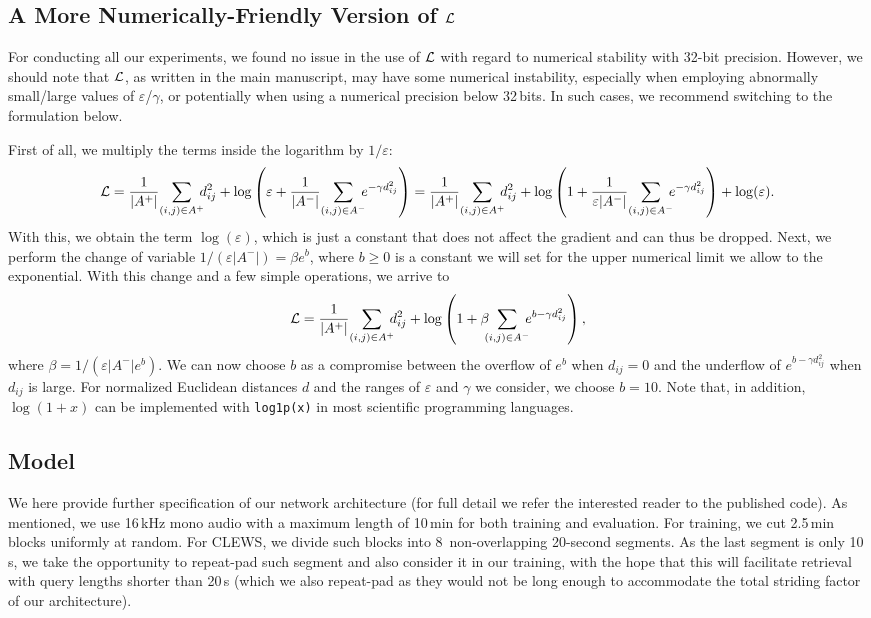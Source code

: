 \subsection{A More Numerically-Friendly Version of $\mathcal{L}$}

For conducting all our experiments, we found no issue in the use of $\mathcal{L}$ with regard to numerical stability with 32-bit precision. However, we should note that $\mathcal{L}$, as written in the main manuscript, may have some numerical instability, especially when employing abnormally small/large values of $\varepsilon$/$\gamma$, or potentially when using a numerical precision below 32\,bits. In such cases, we recommend switching to the formulation below.

First of all, we multiply the terms inside the logarithm by $1/\varepsilon$:
\begin{equation*}
\fu{L} = \frac{1}{|A^+|}\!\sum_{(i,j)\in A^+}\!\!\!d_{ij}^2 + \log\left(\varepsilon + \frac{1}{|A^-|}\!\sum_{(i,j)\in A^-}\!\!\!e^{-\gamma d^2_{ij}}\right) = \frac{1}{|A^+|}\!\sum_{(i,j)\in A^+}\!\!\!d_{ij}^2 + \log\left(1 + \frac{1}{\varepsilon|A^-|}\!\sum_{(i,j)\in A^-}\!\!\!e^{-\gamma d^2_{ij}}\right) + \log(\varepsilon) .
\end{equation*}
With this, we obtain the term $\log(\varepsilon)$, which is just a constant that does not affect the gradient and can thus be dropped. Next, we perform the change of variable $1/(\varepsilon|A^-|)=\beta e^b$, where $b\geq0$ is a constant we will set for the upper numerical limit we allow to the exponential. With this change and a few simple operations, we arrive to
\begin{equation*}
\fu{L} = \frac{1}{|A^+|}\!\sum_{(i,j)\in A^+}\!\!\!d_{ij}^2 + \log\left(1 + \beta\!\!\!\sum_{(i,j)\in A^-}\!\!\!e^{b-\gamma d^2_{ij}}\right) ,
\end{equation*}
where $\beta=1/(\varepsilon|A^-|e^b)$. We can now choose $b$ as a compromise between the overflow of $e^b$ when $d_{ij}=0$ and the underflow of $e^{b-\gamma d_{ij}^2}$ when $d_{ij}$ is large. For normalized Euclidean distances $d$ and the ranges of $\varepsilon$ and $\gamma$ we consider, we choose $b=10$. Note that, in addition, $\log(1+x)$ can be implemented with \verb|log1p(x)| in most scientific programming languages.

\subsection{Model}

We here provide further specification of our network architecture (for full detail we refer the interested reader to the published code). As mentioned, we use 16\,kHz mono audio with a maximum length of 10\,min for both training and evaluation. For training, we cut 2.5\,min blocks uniformly at random. For CLEWS, we divide such blocks into 8~non-overlapping 20-second segments. As the last segment is only 10\,s, we take the opportunity to repeat-pad such segment and also consider it in our training, with the hope that this will facilitate retrieval with query lengths shorter than 20\,s (which we also repeat-pad as they would not be long enough to accommodate the total striding factor of our architecture).

